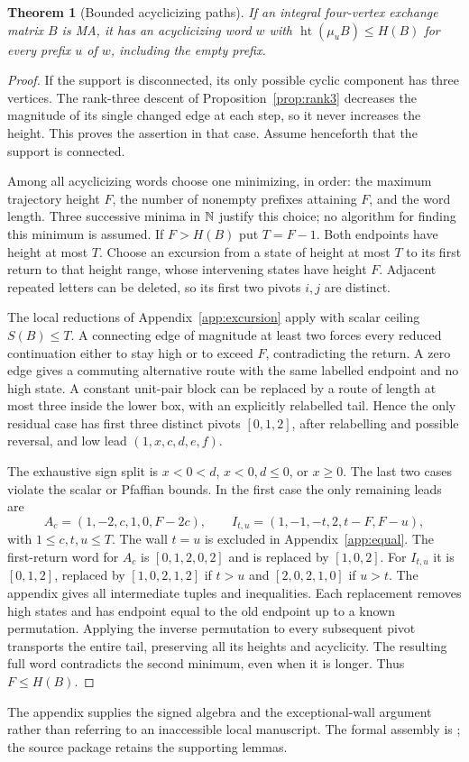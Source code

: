\documentclass[11pt]{amsart}
\newtheorem{theorem}{Theorem}[section]
\theoremstyle{definition}\newtheorem{definition}[theorem]{Definition}
\theoremstyle{remark}\newtheorem{remark}[theorem]{Remark}
\newcommand{\htq}{\operatorname{ht}}\newcommand{\Pf}{\operatorname{Pf}}
\newcommand{\code}[1]{\texttt{\small\detokenize{#1}}}
\begin{document}
\begin{theorem}[Bounded acyclicizing paths]\label{thm:height}
If an integral four-vertex exchange matrix $B$ is MA, it has an acyclicizing word $w$ with $\htq(\mu_uB)\le H(B)$ for every prefix $u$ of $w$, including the empty prefix.
\end{theorem}
\begin{proof}
If the support is disconnected, its only possible cyclic component has three vertices. The rank-three descent of Proposition~\ref{prop:rank3} decreases the magnitude of its single changed edge at each step, so it never increases the height. This proves the assertion in that case. Assume henceforth that the support is connected.

Among all acyclicizing words choose one minimizing, in order: the maximum trajectory height $F$, the number of nonempty prefixes attaining $F$, and the word length. Three successive minima in $\mathbb N$ justify this choice; no algorithm for finding this minimum is assumed. If $F>H(B)$ put $T=F-1$. Both endpoints have height at most $T$. Choose an excursion from a state of height at most $T$ to its first return to that height range, whose intervening states have height $F$. Adjacent repeated letters can be deleted, so its first two pivots $i,j$ are distinct.

The local reductions of Appendix~\ref{app:excursion} apply with scalar ceiling $S(B)\le T$. A connecting edge of magnitude at least two forces every reduced continuation either to stay high or to exceed $F$, contradicting the return. A zero edge gives a commuting alternative route with the same labelled endpoint and no high state. A constant unit-pair block can be replaced by a route of length at most three inside the lower box, with an explicitly relabelled tail. Hence the only residual case has first three distinct pivots $[0,1,2]$, after relabelling and possible reversal, and low lead $(1,x,c,d,e,f)$.

The exhaustive sign split is $x<0<d$, $x<0,d\le0$, or $x\ge0$. The last two cases violate the scalar or Pfaffian bounds. In the first case the only remaining leads are
\[
 A_c=(1,-2,c,1,0,F-2c),\qquad
 I_{t,u}=(1,-1,-t,2,t-F,F-u),
\]
with $1\le c,t,u\le T$. The wall $t=u$ is excluded in Appendix~\ref{app:equal}. The first-return word for $A_c$ is $[0,1,2,0,2]$ and is replaced by $[1,0,2]$. For $I_{t,u}$ it is $[0,1,2]$, replaced by $[1,0,2,1,2]$ if $t>u$ and $[2,0,2,1,0]$ if $u>t$. The appendix gives all intermediate tuples and inequalities. Each replacement removes high states and has endpoint equal to the old endpoint up to a known permutation. Applying the inverse permutation to every subsequent pivot transports the entire tail, preserving all its heights and acyclicity. The resulting full word contradicts the second minimum, even when it is longer. Thus $F\le H(B)$.
\end{proof}
The appendix supplies the signed algebra and the exceptional-wall argument rather than referring to an inaccessible local manuscript. The formal assembly is \code{Rank4Classification.heightCoverage}; the source package retains the supporting lemmas.
\end{document}
